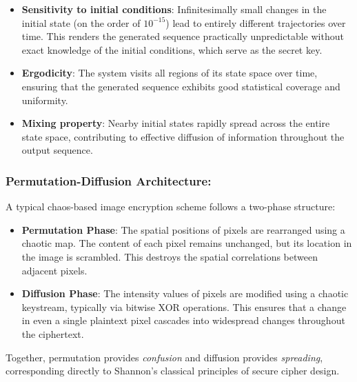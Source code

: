 \begin{itemize}
    \item \textbf{Sensitivity to initial conditions}: Infinitesimally small changes in the initial state (on the order of $10^{-15}$) lead to entirely different trajectories over time. This renders the generated sequence practically unpredictable without exact knowledge of the initial conditions, which serve as the secret key.

    \item \textbf{Ergodicity}: The system visits all regions of its state space over time, ensuring that the generated sequence exhibits good statistical coverage and uniformity.

    \item \textbf{Mixing property}: Nearby initial states rapidly spread across the entire state space, contributing to effective diffusion of information throughout the output sequence.
\end{itemize}

\subsubsection{Permutation-Diffusion Architecture:}

A typical chaos-based image encryption scheme follows a two-phase structure:

\begin{itemize}
    \item \textbf{Permutation Phase}: The spatial positions of pixels are rearranged using a chaotic map. The content of each pixel remains unchanged, but its location in the image is scrambled. This destroys the spatial correlations between adjacent pixels.

    \item \textbf{Diffusion Phase}: The intensity values of pixels are modified using a chaotic keystream, typically via bitwise XOR operations. This ensures that a change in even a single plaintext pixel cascades into widespread changes throughout the ciphertext.
\end{itemize}

Together, permutation provides \emph{confusion} and diffusion provides \emph{spreading}, corresponding directly to Shannon's classical principles of secure cipher design.


